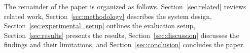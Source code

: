 The remainder of the paper is organized as follows. Section~\ref{sec:related} reviews related work, Section~\ref{sec:methodology} describes the system design, Section~\ref{sec:experimental_setup} outlines the evaluation setup, Section~\ref{sec:results} presents the results, Section~\ref{sec:discussion} discusses the findings and their limitations, and Section~\ref{sec:conclusion} concludes the paper.
